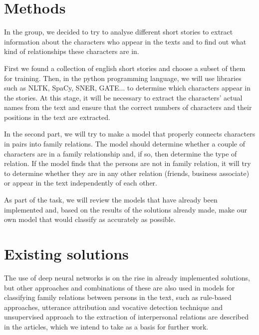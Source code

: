 \documentclass[fleqn,moreauthors,10pt]{ds_report}
\begin{document}
\section*{Methods}

In the group, we decided to try to analyse different short stories to extract information about the characters who appear in the texts and to find out what kind of relationships these characters are in.

First we found a collection of english short stories and choose a subset of them for training. Then, in the python programming language, we will use libraries such as NLTK, SpaCy, SNER, GATE... to determine which characters appear in the stories. At this stage, it will be necessary to extract the characters' actual names from the text and ensure that the correct numbers of characters and their positions in the text are extracted.

In the second part, we will try to make a model that properly connects characters in pairs into family relations. The model should determine whether a couple of characters are in a family relationship and, if so, then determine the type of relation. If the model finds that the persons are not in family relation, it will try to determine whether they are in any other relation (friends, business associate) or appear in the text independently of each other.

As part of the task, we will review the models that have already been implemented and, based on the results of the solutions already made, make our own model that would classify as accurately as possible.




\section*{Existing solutions}

The use of deep neural networks is on the rise in already implemented solutions, but other approaches and combinations of these are also used in models for classifying family relations between persons in the text, such as rule-based approaches, utterance attribution and vocative detection technique and unsupervised approach to the extraction of interpersonal relations are described in the articles, which we intend to take as a basis for further work. \cite{caselli2017event} \cite{nahatame2020revisiting} \cite{trabasso1985causal} \cite{mostafazadeh2016corpus} \cite{dasgupta2018automatic} \cite{mcnamara2012coh} \cite{zwaan1995dimensions} \cite{zwaan1999situation}
\end{document}
